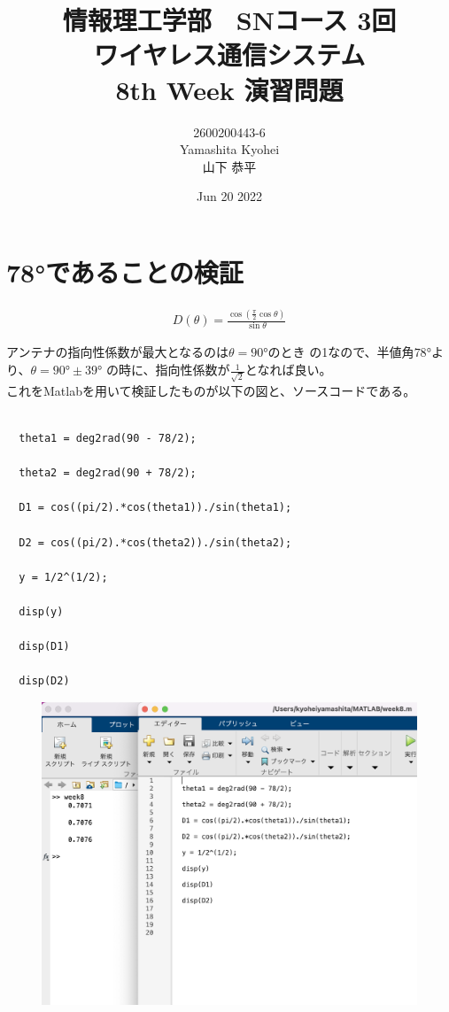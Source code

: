 \documentclass[dvipdfmx,autodetect-engine,titlepage]{jsarticle}
\title{情報理工学部　SNコース 3回\\
ワイヤレス通信システム\\
8th Week 演習問題}
\author{2600200443-6\\Yamashita Kyohei\\山下 恭平}
\date{Jun 20 2022}
\begin{document}
\maketitle

\section{78°であることの検証}

\begin{align*}
  D(\theta) = \frac{\cos(\frac{\pi}{2}\cos\theta)}{\sin\theta}
\end{align*}

アンテナの指向性係数が最大となるのは\begin{math}\theta = 90°\end{math}のとき
の1なので、半値角\begin{math}78°\end{math}より、\begin{math}\theta = 90°\pm39°\end{math}
の時に、指向性係数が\begin{math}\frac{1}{\sqrt{2}}\end{math}となれば良い。\\
これをMatlabを用いて検証したものが以下の図と、ソースコードである。

\begin{lstlisting}[caption=hoge,label=fuga]

  theta1 = deg2rad(90 - 78/2);

  theta2 = deg2rad(90 + 78/2);
  
  D1 = cos((pi/2).*cos(theta1))./sin(theta1);
  
  D2 = cos((pi/2).*cos(theta2))./sin(theta2);
  
  y = 1/2^(1/2);
  
  disp(y)
  
  disp(D1)
  
  disp(D2)
 \end{lstlisting}

 \begin{figure}[h]
  \centering
  \includegraphics[scale=0.35]{pic1.png}
\end{figure}
\end{document}
